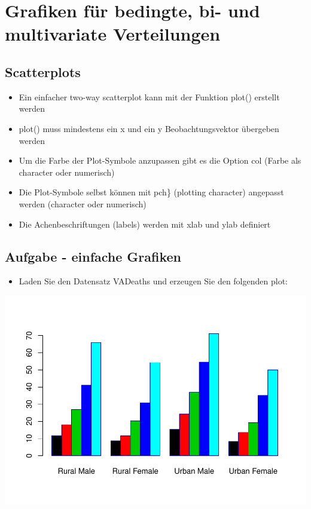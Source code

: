 \documentclass[]{article}
\providecommand{\tightlist}{%
  \setlength{\itemsep}{0pt}\setlength{\parskip}{0pt}}
\begin{document}
\section{Grafiken für bedingte, bi- und multivariate
Verteilungen}\label{grafiken-fur-bedingte-bi--und-multivariate-verteilungen}

\subsection{Scatterplots}\label{scatterplots}

\begin{itemize}
\tightlist
\item
  Ein einfacher two-way scatterplot kann mit der Funktion plot()
  erstellt werden
\item
  plot() muss mindestens ein x und ein y Beobachtungsvektor übergeben
  werden
\item
  Um die Farbe der Plot-Symbole anzupassen gibt es die Option col (Farbe
  als character oder numerisch)
\item
  Die Plot-Symbole selbst können mit pch\} (plotting character)
  angepasst werden (character oder numerisch)
\item
  Die Achenbeschriftungen (labels) werden mit xlab und ylab definiert
\end{itemize}

\subsection{Aufgabe - einfache
Grafiken}\label{aufgabe---einfache-grafiken}

\begin{itemize}
\tightlist
\item
  Laden Sie den Datensatz VADeaths und erzeugen Sie den folgenden plot:
\end{itemize}

\includegraphics{Intro_Datenanalyse1_files/figure-latex/unnamed-chunk-158-1.pdf}
\end{document}
